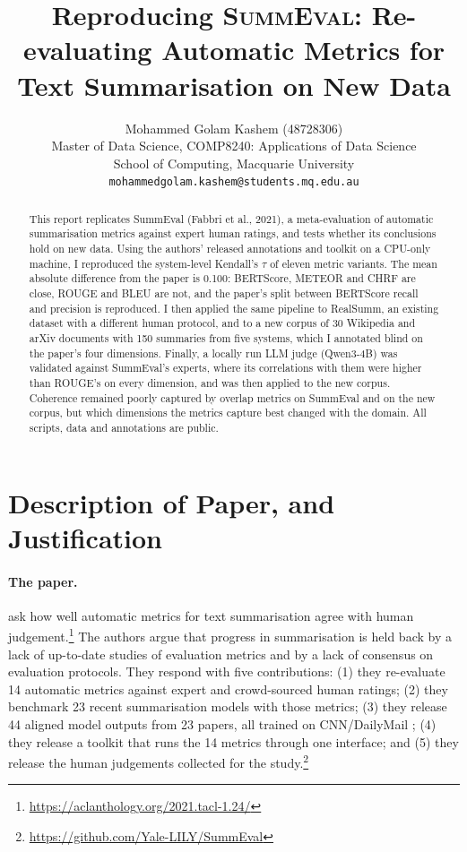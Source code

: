 \documentclass[11pt]{article}
\title{Reproducing \textsc{SummEval}: Re-evaluating Automatic Metrics for
       Text Summarisation on New Data}
\author{
  Mohammed Golam Kashem (48728306)\\
  Master of Data Science, COMP8240: Applications of Data Science \\
  School of Computing, Macquarie University \\
  \texttt{mohammedgolam.kashem@students.mq.edu.au} \\
}
\begin{document}
\maketitle

\begin{abstract}
This report replicates SummEval (Fabbri et al., 2021), a meta-evaluation of automatic summarisation metrics against expert human ratings, and tests whether its conclusions hold on new data. Using the authors' released annotations and toolkit on a CPU-only machine, I reproduced the system-level Kendall's $\tau$ of eleven metric variants. The mean absolute difference from the paper is 0.100: BERTScore, METEOR and CHRF are close, ROUGE and BLEU are not, and the paper's split between BERTScore recall and precision is reproduced. I then applied the same pipeline to RealSumm, an existing dataset with a different human protocol, and to a new corpus of 30 Wikipedia and arXiv documents with 150 summaries from five systems, which I annotated blind on the paper's four dimensions. Finally, a locally run LLM judge (Qwen3-4B) was validated against SummEval's experts, where its correlations with them were higher than ROUGE's on every dimension, and was then applied to the new corpus. Coherence remained poorly captured by overlap metrics on SummEval and on the new corpus, but which dimensions the metrics capture best changed with the domain. All scripts, data and annotations are public.
\end{abstract}

\section{Description of Paper, and Justification}
\label{sec:paper}

\paragraph{The paper.}
\citet{fabbri-etal-2021-summeval} ask how well automatic metrics for text summarisation agree with human judgement.\footnote{\url{https://aclanthology.org/2021.tacl-1.24/}} The authors argue that progress in summarisation is held back by a lack of up-to-date studies of evaluation metrics and by a lack of consensus on evaluation protocols. They respond with five contributions: (1) they re-evaluate 14 automatic metrics against expert and crowd-sourced human ratings; (2) they benchmark 23 recent summarisation models with those metrics; (3) they release 44 aligned model outputs from 23 papers, all trained on CNN/DailyMail \citep{hermann-etal-2015-teaching,nallapati-etal-2016-abstractive}; (4) they release a toolkit that runs the 14 metrics through one interface; and (5) they release the human judgements collected for the study.\footnote{\url{https://github.com/Yale-LILY/SummEval}}
\end{document}
